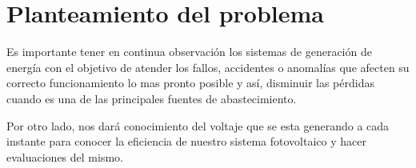 
\section{Planteamiento del problema}

Es importante tener en continua observación los sistemas de generación de energía con el objetivo de atender los fallos, accidentes o anomalías que afecten su correcto funcionamiento lo mas pronto posible y así, disminuir las pérdidas cuando es una de las principales fuentes de abastecimiento.

Por otro lado, nos dará conocimiento del voltaje que se esta generando a cada instante para conocer la eficiencia de nuestro sistema fotovoltaico y hacer evaluaciones del mismo.
